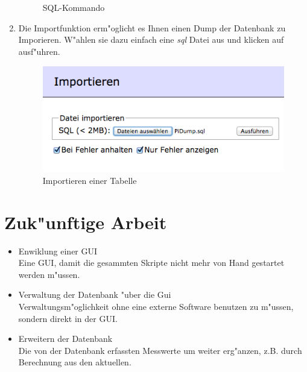 \documentclass[oneside, a4paper, 11pt]{report}
\begin{document}
\begin{enumerate}
\begin{figure}[h!]
							\caption{SQL-Kommando\label{sql}}
						\end{figure}
					\item 
						Die Importfunktion erm"oglicht es Ihnen einen Dump der Datenbank zu Imporieren. W"ahlen sie dazu einfach eine \textit{sql} Datei aus und klicken auf ausf"uhren.
						\begin{figure}[h!]
							\centering
							\includegraphics[width=0.55\linewidth]{img/import.png}
							\caption{Importieren einer Tabelle\label{import}}
						\end{figure}
				\end{enumerate}
	\newpage
	\chapter{Zuk"unftige Arbeit}
		\begin{itemize}
			\item Enwiklung einer GUI\\
				Eine GUI, damit die gesammten Skripte nicht mehr von Hand gestartet werden m"ussen.
			\item Verwaltung der Datenbank "uber die Gui\\
				Verwaltungsm"oglichkeit ohne eine externe Software benutzen zu m"ussen, sondern direkt in der GUI.
			\item Erweitern der Datenbank\\
				Die von der Datenbank erfassten Messwerte um weiter erg"anzen, z.B. durch Berechnung aus den aktuellen.
		\end{itemize}
\end{document}
